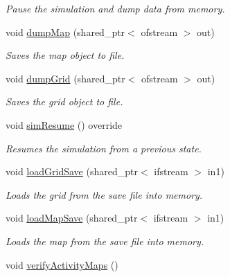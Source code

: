 \begin{DoxyCompactItemize}
\begin{DoxyCompactList}\small\item\em Pause the simulation and dump data from memory. \end{DoxyCompactList}\item 
void \hyperlink{class_spatial_tree_a38b7633da178a31a5279294928b7de09}{dump\+Map} (shared\+\_\+ptr$<$ ofstream $>$ out)
\begin{DoxyCompactList}\small\item\em Saves the map object to file. \end{DoxyCompactList}\item 
void \hyperlink{class_spatial_tree_abe47d47a37bf265337aeae602c65d8bb}{dump\+Grid} (shared\+\_\+ptr$<$ ofstream $>$ out)
\begin{DoxyCompactList}\small\item\em Saves the grid object to file. \end{DoxyCompactList}\item 
void \hyperlink{class_spatial_tree_ad578ceeaf0ab3f4a2e39eb907881c11f}{sim\+Resume} () override
\begin{DoxyCompactList}\small\item\em Resumes the simulation from a previous state. \end{DoxyCompactList}\item 
void \hyperlink{class_spatial_tree_a5bf74321bb2ffdb8cf74a0a624aef7a8}{load\+Grid\+Save} (shared\+\_\+ptr$<$ ifstream $>$ in1)
\begin{DoxyCompactList}\small\item\em Loads the grid from the save file into memory. \end{DoxyCompactList}\item 
void \hyperlink{class_spatial_tree_abbb3de8e0dbc9c08feb0d52882db5b66}{load\+Map\+Save} (shared\+\_\+ptr$<$ ifstream $>$ in1)
\begin{DoxyCompactList}\small\item\em Loads the map from the save file into memory. \end{DoxyCompactList}\item 
void \hyperlink{class_spatial_tree_af2fe54f787584c4fde048ebc96556a51}{verify\+Activity\+Maps} ()\hypertarget{class_spatial_tree_af2fe54f787584c4fde048ebc96556a51}{}\label{class_spatial_tree_af2fe54f787584c4fde048ebc96556a51}


\end{DoxyCompactItemize}
